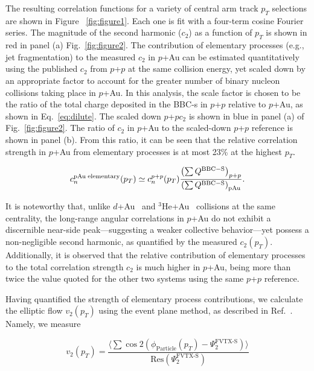\documentclass[%
reprint,
showpacs,preprintnumbers,
 amsmath,amssymb,
 aps,
]{revtex4-1}
\newcommand{\pt}{\mbox{$p_T$}\xspace}
\newcommand{\dau}{\mbox{$d$+Au}\xspace}
\newcommand{\pau}{\mbox{$p$+Au}\xspace}
\newcommand{\hau}{\mbox{$^3\text{He}$+Au}\xspace}
\newcommand{\pp}{\mbox{$p$+$p$}\xspace}
\begin{document}
The resulting correlation functions for a variety of central arm track \pt selections are shown in Figure ~\ref{fig:figure1}. Each one is fit with a four-term cosine Fourier series. The magnitude of the second harmonic ($c_{2}$) as a function of \pt is shown in red in panel (a) Fig.~\ref{fig:figure2}. The contribution of elementary processes (e.g., jet fragmentation) to the measured $c_2$ in \pau can be estimated quantitatively using the published $c_2$ from \pp at the same collision energy, yet scaled down by an appropriate factor to account for the greater number of binary nucleon collisions taking place in \pau. In this analysis, the scale factor is chosen to be the ratio of the total charge deposited in the BBC-s in \pp relative to \pau, as shown in Eq.~\ref{eq:dilute}. The scaled down \pp $c_{2}$ is shown in blue in panel (a) of Fig.~\ref{fig:figure2}. The ratio of $c_2$ in \pau to the scaled-down \pp reference is shown in panel (b). From this ratio, it can be seen that the relative correlation strength in \pau from elementary processes is at most 23\% at the highest \pt.

\begin{equation}
c_{n}^{{\rm pAu \; elementary}}(p_{T}) \simeq c_{n}^{p+p}(p_{T})
\frac{\left( \sum Q^{{\rm BBC-S}} \right)_{p+p}}
{\left( \sum Q^{{\rm BBC-S}} \right)_{{\rm pAu}}
}.
\label{eq:dilute}
\end{equation}

It is noteworthy that, unlike \dau~\cite{adare_measurement_2014} and \hau~\cite{PhysRevLett.115.142301} collisions at the same centrality, the long-range angular correlations in \pau do not exhibit a discernible near-side peak---suggesting a weaker collective behavior---yet possess a non-negligible second harmonic, as quantified by the measured $c_2(p_T)$. Additionally, it is observed that the relative contribution of elementary processes to the total correlation strength $c_2$ is much higher in \pau, being more than twice the value quoted for the other two systems using the same \pp reference. 

Having quantified the strength of elementary process contributions, we calculate the elliptic flow $v_2(p_T)$ using the event plane method, as described in Ref.~\cite{Adare:2015ctn}. Namely, we measure 

\begin{equation}
v_{2}(p_{T}) = \frac{\langle\sum \cos 2(\phi_{\text{Particle}}(p_{T})-\Psi^{\text{FVTX-S}}_{2})\rangle}{\text{Res}(\Psi^{\text{FVTX-S}}_{2})}
\end{equation}
\end{document}
